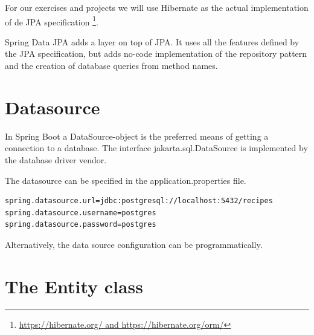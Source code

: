 For our exercises and projects we will use Hibernate as the actual implementation of de JPA specification \footnote{\url{https://hibernate.org/ and https://hibernate.org/orm/}}.  

Spring Data JPA adds a layer on top of JPA. It uses all the features defined by the JPA specification, but adds no-code implementation of the repository pattern and the creation of database queries from method names.

\section{Datasource}

In Spring Boot a DataSource-object is the preferred means of getting a connection to a database.
The interface jakarta.sql.DataSource is implemented by the database driver vendor. 

The datasource can be specified in the application.properties file.

\begin{lstlisting}
spring.datasource.url=jdbc:postgresql://localhost:5432/recipes
spring.datasource.username=postgres
spring.datasource.password=postgres
\end{lstlisting}

Alternatively, the data source configuration can be programmatically.


\section{The Entity class}

